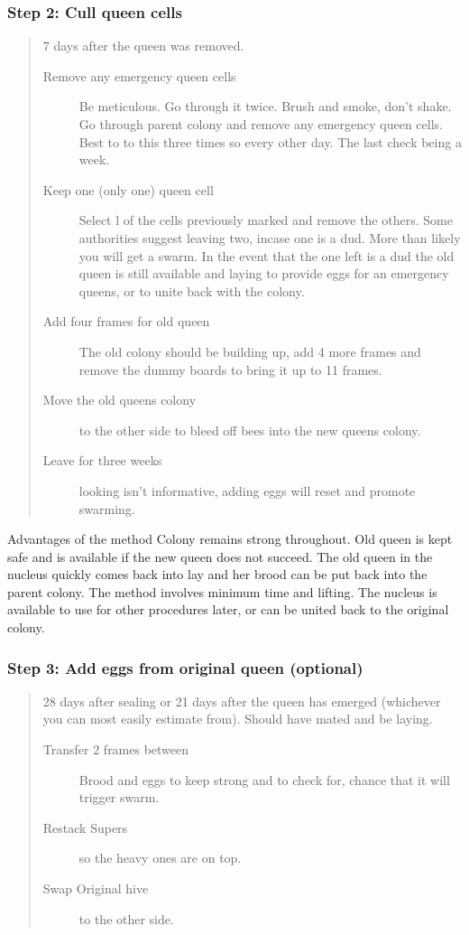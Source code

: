 \subsubsection*{Step 2: Cull queen cells}

\begin{quotation}
7 days after the queen was removed.
\begin{description}
  \item[Remove any emergency queen cells] Be meticulous.  Go through it twice.  Brush and smoke, don't shake.
	Go through parent colony and remove any emergency queen cells.  Best to to this three times so every other day.  The last check being a week.
  \item[Keep one (only one) queen cell]
	Select l of the cells previously marked and remove the others.
	Some authorities suggest leaving two, incase one is a dud.
	More than likely you will get a swarm.
	In the event that the one left is a dud the old queen is still available and laying to provide eggs for an emergency queens,
	or to unite back with the colony.
  \item[Add four frames for old queen] The old colony should be building up, add 4 more frames and remove the dummy boards to bring it up to 11 frames.
  \item[Move the old queens colony] to the other side to bleed off bees into the new queens colony.
  \item[Leave for three weeks] looking isn't informative, adding eggs will reset and promote swarming.

\end{description}
\end{quotation}

Advantages of the method
Colony remains strong throughout.
Old queen is kept safe and is available if the new queen does not succeed.
The old queen in the nucleus quickly comes back into lay and her brood can be put back into the parent colony.
The method involves minimum time and lifting.
The nucleus is available to use for other procedures later, or can be united back to the original colony.

\subsubsection*{Step 3: Add eggs from original queen (optional)}


\begin{quotation}
28 days after sealing or 21 days after the queen has emerged (whichever you can most easily estimate from).
Should have mated and be laying.

\begin{description}
  \item[Transfer 2 frames between] Brood and eggs to keep strong and to check for, chance that it will trigger swarm.
  \item[Restack Supers] so the heavy ones are on top.
  \item[Swap Original hive] to the other side.
\end{description}
\end{quotation}

